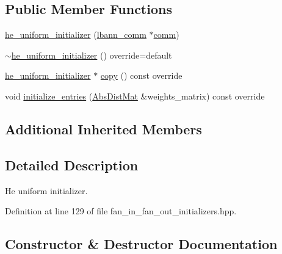 \subsection*{Public Member Functions}
\begin{DoxyCompactItemize}
\item 
\hyperlink{classlbann_1_1he__uniform__initializer_a17bc65cd69fbce240c2050c228a2682c}{he\+\_\+uniform\+\_\+initializer} (\hyperlink{classlbann_1_1lbann__comm}{lbann\+\_\+comm} $\ast$\hyperlink{file__io_8cpp_ab048c6f9fcbcfaa57ce68b00263dbebe}{comm})
\item 
\hyperlink{classlbann_1_1he__uniform__initializer_a04aa97a63397eec43eba03f377704af3}{$\sim$he\+\_\+uniform\+\_\+initializer} () override=default
\item 
\hyperlink{classlbann_1_1he__uniform__initializer}{he\+\_\+uniform\+\_\+initializer} $\ast$ \hyperlink{classlbann_1_1he__uniform__initializer_a9860575b43f3d08831d00219bb07ec73}{copy} () const override
\item 
void \hyperlink{classlbann_1_1he__uniform__initializer_a8f86401b0b216ba159f57d3475769a24}{initialize\+\_\+entries} (\hyperlink{base_8hpp_a9a697a504ae84010e7439ffec862b470}{Abs\+Dist\+Mat} \&weights\+\_\+matrix) const override
\end{DoxyCompactItemize}
\subsection*{Additional Inherited Members}


\subsection{Detailed Description}
He uniform initializer. 

Definition at line 129 of file fan\+\_\+in\+\_\+fan\+\_\+out\+\_\+initializers.\+hpp.



\subsection{Constructor \& Destructor Documentation}
\mbox{\label{classlbann_1_1he__uniform__initializer_a17bc65cd69fbce240c2050c228a2682c}} 
